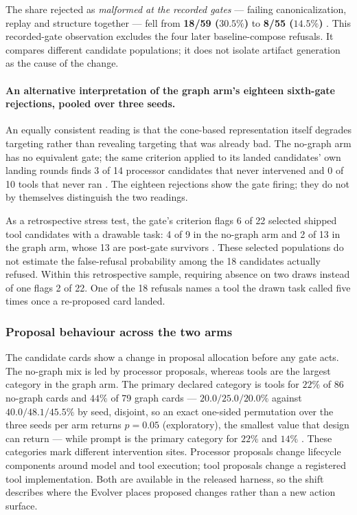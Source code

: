 The share rejected as \emph{malformed at the recorded gates} ---
failing canonicalization, replay and structure together --- fell from
\textbf{18/59 ($30.5\%$)} to \textbf{8/55 ($14.5\%$)} . This
recorded-gate observation excludes the four later baseline-compose
refusals. It compares different candidate populations;
it does not isolate artifact generation as the cause of the change.

\paragraph{An alternative interpretation of the graph arm's eighteen
sixth-gate rejections, pooled over three seeds.} An equally
consistent reading is that the cone-based representation itself degrades
targeting rather than revealing targeting that was already bad. The
no-graph arm has no equivalent gate; the same criterion applied to its
landed candidates' own landing rounds finds 3 of 14 processor candidates
that never intervened and 0 of 10 tools that never ran . The eighteen
rejections show the gate firing; they do not by themselves distinguish the
two readings.

As a retrospective stress test, the gate's criterion flags 6 of 22 selected
shipped tool candidates with a drawable task: 4 of 9 in the no-graph arm and
2 of 13 in the graph arm, whose 13 are post-gate survivors . These
selected populations do not estimate the false-refusal probability among the
18 candidates actually refused. Within this retrospective sample, requiring
absence on two draws instead of one flags 2 of 22. One of the 18 refusals
names a tool the drawn task called five times once a re-proposed card landed.

\subsubsection*{Proposal behaviour across the two arms}
\label{sec:proposal-face}

The candidate cards show a change in proposal allocation before any gate
acts. The no-graph mix is led by processor proposals, whereas tools are the
largest category in the graph arm. The primary declared category is tools
for $22\%$ of 86 no-graph cards and $44\%$ of 79 graph cards ---
$20.0/25.0/20.0\%$ against $40.0/48.1/45.5\%$ by seed, disjoint, so an
exact one-sided permutation over the three seeds per arm returns
$p = 0.05$ (exploratory), the smallest value that design can return --- while prompt is
the primary category for $22\%$ and $14\%$ . These categories mark different intervention
sites. Processor proposals change lifecycle components around model and tool
execution; tool proposals change a registered tool implementation. Both are
available in the released harness, so the shift describes where the Evolver
places proposed changes rather than a new action surface.


